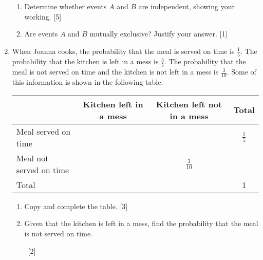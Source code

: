 \begin{enumerate}
\begin{enumerate}[label=(\roman*)]
	\item Determine whether events $A$ and $B$ are independent, showing your working.  \hfill[5]
	\item Are events $A$ and $B$ mutually exclusive? Justify your answer. \hfill[1]
\end{enumerate}

\newpage 

\item	When Joanna cooks, the probability that the meal is served on time is $\frac{1}{5}$. The probability that the
kitchen is left in a mess is $\frac{3}{5}$. The probability that the meal is not served on time and the kitchen is not
left in a mess is $\frac{3}{10}$. Some of this information is shown in the following table.


\medskip

\begin{table}[!htpb]
	\centering
	\begin{tabular}{l|c|c|c|}
		\cline{2-4}
		& Kitchen left in a mess & Kitchen left not in a mess & Total \\ \hline
		\multicolumn{1}{|l|}{Meal served on time}     &                        &                            &   $\frac{1}{5}$    \\ \hline
		\multicolumn{1}{|l|}{Meal not served on time} &                        &                  $\frac{3}{10}$          &       \\ \hline
		\multicolumn{1}{|l|}{Total}                   &                        &                            & 1     \\ \hline
	\end{tabular}
\end{table}

\begin{enumerate}[label=(\roman*)]
	\item Copy and complete the table. \hfill[3]
	\item Given that the kitchen is left in a mess, find the probability that the meal is not served on time. 
	
	
	\,\quad 
	\hfill 
	[2]
\end{enumerate}




\end{enumerate}
